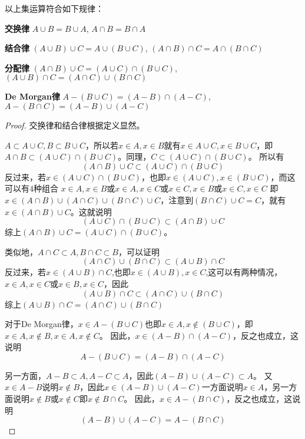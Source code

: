 \begin{theorem}
	以上集运算符合如下规律：

	\textbf{交换律} $A \cup B = B \cup A$, $A \cap B = B \cap A$

	\textbf{结合律} $(A \cup B) \cup C = A \cup (B \cup C)$, $(A \cap B) \cap C = A \cap (B \cap C)$

	\textbf{分配律} $(A \cap B) \cup C = (A \cup C) \cap (B \cup C)$, $(A \cup B) \cap C = (A \cap C) \cup (B \cap C)$

	\textbf{De Morgan律} $A - (B \cup C) = (A - B) \cap (A - C)$, $A - (B \cap C) = (A - B) \cup (A - C)$

\end{theorem}

\begin{proof}
	交换律和结合律根据定义显然。

	$A \subset A \cup C, B \subset B \cup C$，所以若$x \in A, x \in B$就有$x \in A \cup C, x \in B \cup C$，即
	$A \cap B \subset (A \cup C) \cap (B \cup C)$。同理，$C \subset (A \cup C) \cap (B \cup C)$。
	所以有$$(A \cap B) \cup C \subset (A \cup C) \cap (B \cup C)$$
	反过来，若$x \in (A \cup C) \cap (B \cup C)$，也即$x \in (A \cup C), x \in (B \cup C)$，而这可以有$4$种组合
	$x \in A, x \in B \text{或}x \in A, x \in C \text{或}x \in C, x \in B \text{或}x \in C, x \in C$
	即$x \in (A \cap B) \cup (A \cap C) \cup (B \cap C) \cup C$，注意到$(B \cap C) \cup C = C$，就有$x \in (A \cap B) \cup C$。这就说明
	$$(A \cup C) \cap (B \cup C) \subset (A \cap B) \cup C$$
	综上$(A \cap B) \cup C = (A \cup C) \cap (B \cup C)$。

	类似地，$A \cap C \subset A, B \cap C \subset B$，可以证明
	$$(A \cap C) \cup (B \cap C) \subset (A \cup B) \cap C$$
	反过来，若$x \in (A \cup B) \cap C$,也即$x \in (A \cup B), x \in C$,这可以有两种情况，$x \in A, x \in C$或$x \in B, x \in C$，因此
	$$(A \cup B) \cap C \subset (A \cap C) \cup (B \cap C)$$
	综上$(A \cup B) \cap C = (A \cap C) \cup (B \cap C)$

	对于De Morgan律，$x \in A - (B \cup C)$也即$x \in A, x \notin (B \cup C)$，即$x \in A, x \notin B, x \in A, x \notin C$。
	因此，$x \in (A - B) \cap (A - C)$，反之也成立，这说明
	$$A - (B \cup C) = (A - B) \cap (A - C)$$

	另一方面，$A - B \subset A, A - C \subset A$，因此$(A - B) \cup (A - C) \subset A$。
	又$x \in A - B$说明$x \notin B$，因此$x \in (A - B) \cup (A - C)$一方面说明$x \in A$，另一方面说明$x \notin B$或$x \notin C$即$x \notin B \cap C$。
	因此，$x \in A - (B \cap C)$，反之也成立，这说明
	$$(A - B) \cup (A - C) = A - (B \cap C)$$
\end{proof}


